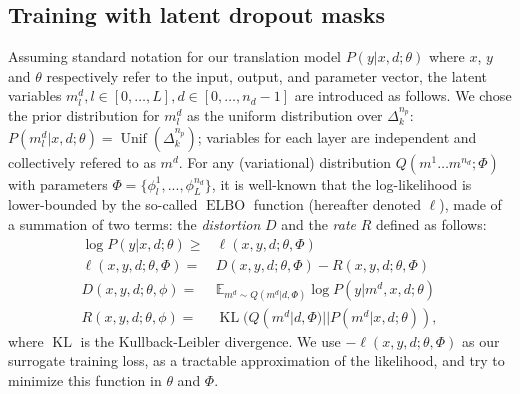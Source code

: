 \documentclass[11pt]{article}
\begin{document}
\subsection{Training with latent dropout masks}
Assuming standard notation for our translation model  $P(y|x,d;\theta)$ where $x$, $y$ and $\theta$ respectively refer to the input, output, and parameter vector, the latent variables $m_{l}^d, l \in[0,\dots,L], d \in [0, \dots, n_d-1]$ are introduced as follows. We chose the prior distribution for $m_{l}^d$ as the uniform distribution over $\Delta^{n_p}_k$: $P(m_l^d | x, d; \theta) = \operatorname{Unif}(\Delta^{n_p}_k)$; variables for each layer are independent and collectively refered to as $m^d$. For any (variational) distribution $Q(m^1 \dots m^{n_d}; \Phi)$ with parameters $\Phi=\{\phi_l^1, ..., \phi_L^{n_d}\}$, it is well-known that the log-likelihood is lower-bounded by the so-called $\operatorname{ELBO}$ function (hereafter denoted $\ell$), made of a summation of two terms: the \emph{distortion} $D$ and the \emph{rate} $R$ defined as follows:%
\begin{align}
  \log P(y|x,d;\theta) \ge & \ell(x,y,d; \theta, \Phi) \nonumber \\
  \ell(x,y,d; \theta, \Phi) =&  D(x,y,d; \theta, \Phi) - R(x,y,d; \theta, \Phi) \label{eq:lower-bound}\\
  D(x,y,d; \theta, \phi) = & \mathbb{E}_{m^d \sim Q(m^d |d,\Phi)} \log P(y | m^d, x, d; \theta) \nonumber\\
  R(x,y,d; \theta, \phi) = & \operatorname{KL}(Q(m^d | d, \Phi)||P(m^d | x,d; \theta)), \nonumber
\end{align}
where $\operatorname{KL}$ is the Kullback-Leibler divergence. We use $-\ell(x,y,d; \theta,\Phi)$ as our surrogate training loss, as a tractable approximation of the likelihood, and try to minimize this function in $\theta$ and $\Phi$.
\end{document}
